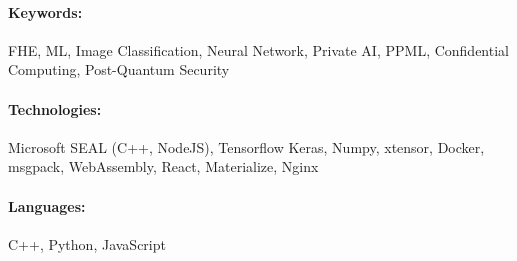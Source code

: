 \paragraph{Keywords:}
FHE, ML, Image Classification, Neural Network,
Private AI, PPML, Confidential Computing,
Post-Quantum Security

\paragraph{Technologies:}
Microsoft SEAL (C++, NodeJS),
Tensorflow Keras,
Numpy,
xtensor,
Docker,
msgpack,
WebAssembly,
React,
Materialize,
Nginx

\paragraph{Languages:}
C++, Python, JavaScript
